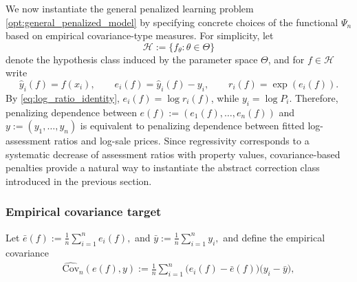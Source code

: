 \documentclass[12pt, draft]{article}
\theoremstyle{plain}
\theoremstyle{definition}
\newcommand{\1}{\mathbf{1}}
\newcommand{\Cov}{\text{Cov}}
\renewcommand{\H}{\mathcal{H}}
\begin{document}
{We now instantiate the general penalized learning problem \eqref{opt:general_penalized_model} by specifying concrete choices of the functional $\Psi_n$ based on empirical covariance-type measures. For simplicity, let
\[
\H := \{f_\theta : \theta \in \Theta\}
\]
denote the hypothesis class induced by the parameter space $\Theta$, and for $f \in \H$ write
\[
\hat y_i(f) = f(x_i),
\qquad
e_i(f) = \hat y_i(f) - y_i,
\qquad
r_i(f) = \exp(e_i(f)).
\]
By \eqref{eq:log_ratio_identity}, $e_i(f)=\log r_i(f)$, while $y_i=\log P_i$. Therefore, penalizing dependence between $e(f):=(e_1(f),\dots,e_n(f))$ and $y:=(y_1,\dots,y_n)$ is equivalent to penalizing dependence between fitted log-assessment ratios and log-sale prices. Since regressivity corresponds to a systematic decrease of assessment ratios with property values, covariance-based penalties provide a natural way to instantiate the abstract correction class introduced in the previous section.

\subsubsection{Empirical covariance target}





Let
$
\bar e(f) := \frac{1}{n}\sum_{i=1}^n e_i(f),
$
and
$
\bar y := \frac{1}{n}\sum_{i=1}^n y_i,
$
and define the empirical covariance
\begin{align}
    \label{eq:empirical_covariance}
    \widehat{\Cov}_n(e(f),y)
    :=
    \frac{1}{n}\sum_{i=1}^n
    \bigl(e_i(f)-\bar e(f)\bigr)\bigl(y_i-\bar y\bigr),
\end{align}


}
\end{document}
